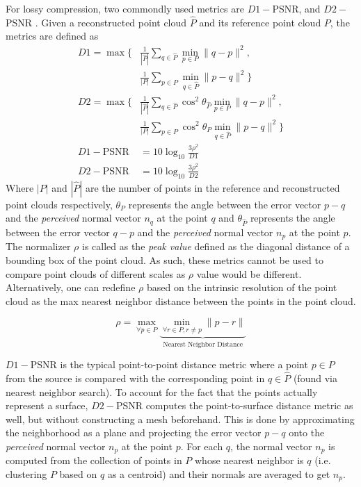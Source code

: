 For lossy compression, two commondly used metrics are $D1-$PSNR, and $D2-$PSNR \cite{tian2017geometric}. Given a reconstructed point cloud $\hat{P}$ and its reference point cloud $P$, the metrics are defined as
$$
\begin{aligned}
    D1 = \max \Bigg \{ & \frac{1}{|\hat{P}|} \sum_{q \in \hat{P}} \min_{p \in P} \|q -p\|^2, \\ 
    & \frac{1}{|P|} \sum_{p \in P} \min_{q \in \hat{P}} \|p -q\|^2 \Bigg \} \\
    D2 = \max \Bigg \{ &\frac{1}{|\hat{P}|} \sum_{q \in \hat{P}} \cos^2 \theta_{\hat{P}}\min_{p \in P} \|q -p\|^2, \\
    & \frac{1}{|P|} \sum_{p \in P} \cos^2 \theta_{P}\min_{q \in \hat{P}} \|p -q\|^2 \Bigg  \} \\
    D1-\text{PSNR} &= 10 \log_{10} \frac{3\rho^2}{D1}  \\
    D2-\text{PSNR} &= 10 \log_{10} \frac{3\rho^2}{D2} 
\end{aligned}
$$
Where $|P|$ and $|\hat{P}|$ are the number of points in the reference and reconstructed point clouds respectively, $\theta_P$ represents the angle between the error vector $p - q$ and the \textit{perceived} normal vector $n_q$ at the point $q$ and $\theta_{\hat{P}}$ represents the angle between the error vector $q - p$ and the \textit{perceived} normal vector $n_p$ at the point $p$. The normalizer $\rho$ is called as the \textit{peak value} defined as the diagonal distance of a bounding box of the point cloud. As such, these metrics cannot be used to compare point clouds of different scales as $\rho$ value would be different. Alternatively, one can redefine $\rho$ based on the intrinsic resolution of the point cloud as the max nearest neighbor distance between the points in the point cloud.

$$
\rho = \max_{\forall p \in P} \underbrace{\min_{\forall r \in P, r \neq p} \|p - r\|}_{\text{Nearest Neighbor Distance}}
$$

$D1-$PSNR is the typical point-to-point distance metric where a point $p\in P$ from the source is compared with the corresponding point in $q \in \hat{P}$ (found via nearest neighbor search). To account for the fact that the points actually represent a surface, $D2-$PSNR computes the point-to-surface distance metric as well, but without constructing a mesh beforehand. This is done by approximating the neighborhood as a plane and projecting the error vector $p - q$ onto the \textit{perceived} normal vector $n_p$ at the point $p$. For each $q$, the normal vector $n_p$ is computed from the collection of points in $P$ whose nearest neighbor is $q$ (i.e. clustering $P$ based on $q$ as a centroid) and their normals are averaged to get $n_p$.

